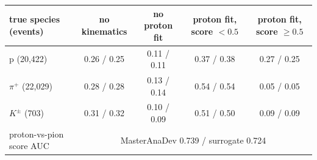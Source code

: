 \begin{tabular}{lcccc}
\toprule
true species (events) & no kinematics & no proton fit & proton fit, score $<0.5$ & proton fit, score $\geq 0.5$ \\
\midrule
p (20,422) & 0.26 / 0.25 & 0.11 / 0.11 & 0.37 / 0.38 & 0.27 / 0.25 \\
$\pi^+$ (22,029) & 0.28 / 0.28 & 0.13 / 0.14 & 0.54 / 0.54 & 0.05 / 0.05 \\
$K^\pm$ (703) & 0.31 / 0.32 & 0.10 / 0.09 & 0.51 / 0.50 & 0.09 / 0.09 \\
\midrule
proton-vs-pion score AUC & \multicolumn{4}{c}{MasterAnaDev 0.739 / surrogate 0.724} \\
\bottomrule
\end{tabular}
